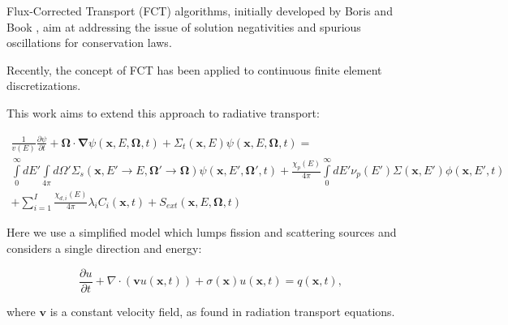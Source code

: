 Flux-Corrected Transport (FCT) algorithms, 
initially developed by Boris and Book \cite{borisbook}, aim at addressing  the issue of solution negativities and spurious oscillations for conservation laws.

Recently, the concept of FCT has been applied to continuous finite element discretizations.

This work aims to extend this approach to radiative transport:

\begin{multline}
  \frac{1}{v(E)}\frac{\partial\psi}{\partial t}
  + \mathbf{\Omega}\cdot\mathbf{\nabla}\psi(\mathbf{x},E,\mathbf{\Omega},t)
	+ \Sigma_t(\mathbf{x},E)\psi(\mathbf{x},E,\mathbf{\Omega},t)
  = \\
  \int\limits_0^\infty dE'\int\limits_{4\pi}d\Omega'\Sigma_s(\mathbf{x},
    E'\rightarrow E,\mathbf{\Omega}'\rightarrow\mathbf{\Omega})
    \psi(\mathbf{x},E',\mathbf{\Omega}',t)
    + \frac{\chi_p(E)}{4\pi}\int\limits_0^\infty dE'\nu_p(E')\Sigma(\mathbf{x},E')
    \phi(\mathbf{x},E',t)\\
  + \sum\limits_{i=1}^I\frac{\chi_{d,i}(E)}{4\pi}\lambda_i C_i(\mathbf{x},t)
  + S_{ext}(\mathbf{x},E,\mathbf{\Omega},t)
\end{multline}

Here we use a simplified model which lumps fission and
scattering sources and considers a single direction and energy:

\begin{equation}\label{eq:tr}
  \frac{\partial u}{\partial t} + \nabla\cdot(\mathbf{v}u(\mathbf{x},t))
  + \sigma(\mathbf{x})u(\mathbf{x},t) = q(\mathbf{x},t),
\end{equation}

where $\mathbf{v}$ is a constant velocity field, as found in
radiation transport equations. 


